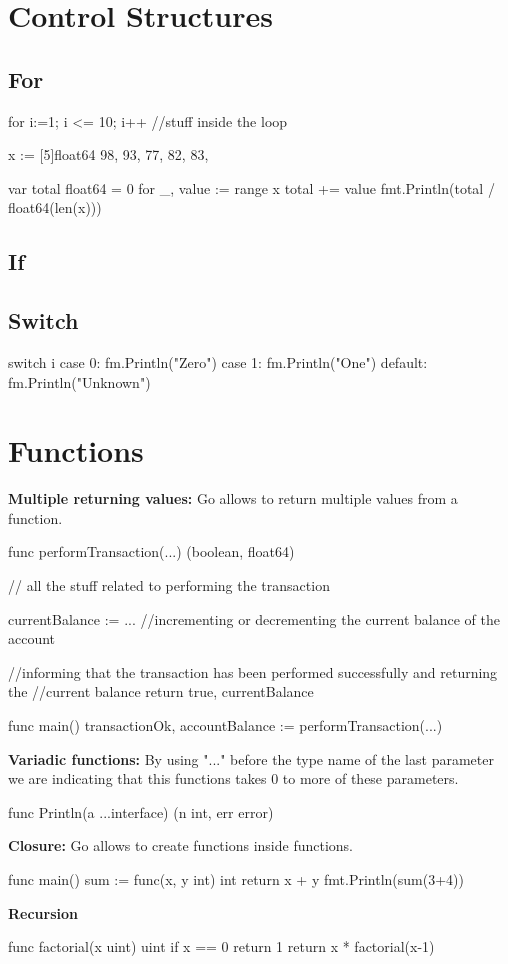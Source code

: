 \documentclass[twoside,a4paper,english]{report}
\begin{document}
\chapter{Control Structures}
\section{For}
\begin{go}
for i:=1; i <= 10; i++ {
  //stuff inside the loop
}

x := [5]float64{
  98,
  93,
  77,
  82,
  83,
}

var total float64 = 0
for _, value := range x {
  total += value
}
fmt.Println(total / float64(len(x)))
\end{go}
\section{If}
\section{Switch}
\begin{go}
switch i {
  case 0: fm.Println("Zero")
  case 1: fm.Println("One")
  default: fm.Println("Unknown")
} 
\end{go}
\chapter{Functions}
\textbf{Multiple returning values:} Go allows to return multiple values from a function.
\begin{go}
func performTransaction(...) (boolean, float64) {
  // all the stuff related to performing the transaction

  currentBalance := ... //incrementing or decrementing the current balance of the account

  //informing that the transaction has been performed successfully and returning the //current balance
  return true, currentBalance
}

func main() {
  transactionOk, accountBalance := performTransaction(...)
}
\end{go}
\vspace{0.7cm}
\textbf{Variadic functions:} By using "..." before the type name of the last parameter we are indicating that this functions takes 0 to more of these parameters.
\begin{go}
func Println(a ...interface{}) (n int, err error)
\end{go}
\vspace{0.7cm}
\textbf{Closure:} Go allows to create functions inside functions.
\begin{go}
func main() {
  sum := func(x, y int) int {
    return x + y
  }
  fmt.Println(sum(3+4))
}
\end{go}
\vspace{0.7cm}
\textbf{Recursion}
\begin{go}
func factorial(x uint) uint {
  if x == 0 {
    return 1
  }
  return x * factorial(x-1)
}   
\end{go}
\end{document}

